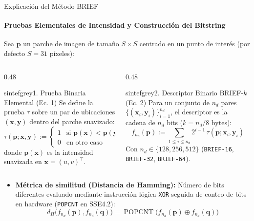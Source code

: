 \documentclass{beamer}
\begin{document}
\begin{frame}{Explicación del Método BRIEF}
\framesubtitle{Pruebas Elementales de Intensidad y Construcción del Bitstring}
\scriptsize
Sea $\mathbf{p}$ un parche de imagen de tamaño $S \times S$ centrado en un punto de interés (por defecto $S = 31$ píxeles):
\begin{columns}[T]
\begin{column}{0.48\textwidth}
\begin{colorblock}[black]{sintefgrey}{1. Prueba Binaria Elemental (Ec. 1)}
\scriptsize
Se define la prueba $\tau$ sobre un par de ubicaciones $(\mathbf{x}, \mathbf{y})$ dentro del parche suavizado:
\begin{equation*}
\tau(\mathbf{p}; \mathbf{x}, \mathbf{y}) :=
\begin{cases}
1 & \text{si } \mathbf{p}(\mathbf{x}) < \mathbf{p}(\mathbf{y}) \\
0 & \text{en otro caso}
\end{cases}
\end{equation*}
donde $\mathbf{p}(\mathbf{x})$ es la intensidad suavizada en $\mathbf{x} = (u, v)^\top$.
\end{colorblock}
\end{column}
\begin{column}{0.48\textwidth}
\begin{colorblock}[black]{sintefgrey}{2. Descriptor Binario BRIEF-$k$ (Ec. 2)}
\scriptsize
Para un conjunto de $n_d$ pares $\{(\mathbf{x}_i, \mathbf{y}_i)\}_{i=1}^{n_d}$, el descriptor es la cadena de $n_d$ bits ($k = n_d/8$ bytes):
\begin{equation*}
f_{n_d}(\mathbf{p}) := \sum_{1 \le i \le n_d} 2^{i-1}\,\tau(\mathbf{p}; \mathbf{x}_i, \mathbf{y}_i)
\end{equation*}
Con $n_d \in \{128, 256, 512\}$ (\texttt{BRIEF-16}, \texttt{BRIEF-32}, \texttt{BRIEF-64}).
\end{colorblock}
\end{column}
\end{columns}
\vspace{0.15cm}
\begin{itemize}
    \item \textbf{Métrica de similitud (Distancia de Hamming):} Número de bits diferentes evaluado mediante instrucción lógica \texttt{XOR} seguida de conteo de bits en hardware (\texttt{POPCNT} en SSE4.2):
    \[
        d_H\big(f_{n_d}(\mathbf{p}), f_{n_d}(\mathbf{q})\big) = \operatorname{POPCNT}\!\big(f_{n_d}(\mathbf{p}) \oplus f_{n_d}(\mathbf{q})\big)
    \]
\end{itemize}
\end{frame}
\end{document}

